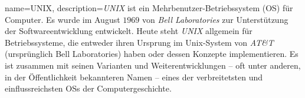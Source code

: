 	{%
		name={UNIX},
		description={\textit{UNIX} ist ein Mehrbenutzer-Betriebssystem (OS) für Computer. Es wurde im August $1969$ von \textit{Bell Laboratories} zur Unterstützung der Softwareentwicklung entwickelt. Heute steht \textit{UNIX} allgemein für Betriebssysteme, die entweder ihren Ursprung im Unix-System von \textit{AT\&T} (ursprünglich Bell Laboratories) haben oder dessen Konzepte implementieren. Es ist zusammen mit seinen Varianten und Weiterentwicklungen – oft unter anderen, in der Öffentlichkeit bekannteren Namen – eines der verbreitetsten und einflussreichsten OSs der Computergeschichte.}
	}

\fi

